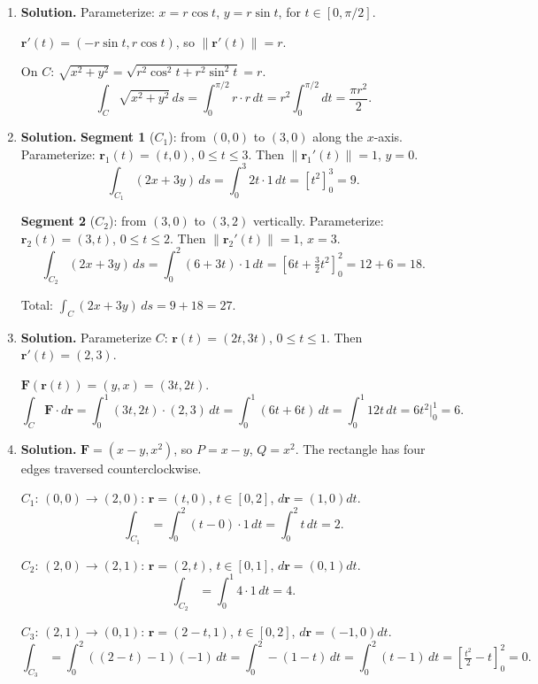 \begin{enumerate}
\item \textbf{Solution.}
Parameterize: $x = r\cos t$, $y = r\sin t$, for $t\in[0,\pi/2]$.

$\mathbf{r}'(t) = (-r\sin t, r\cos t)$, so $\|\mathbf{r}'(t)\| = r$.

On $C$: $\sqrt{x^2+y^2} = \sqrt{r^2\cos^2 t + r^2\sin^2 t} = r$.
\[
\int_C \sqrt{x^2+y^2}\,ds = \int_0^{\pi/2} r\cdot r\,dt = r^2\int_0^{\pi/2}dt = \boxed{\frac{\pi r^2}{2}}.
\]

\item \textbf{Solution.}
\textbf{Segment 1} ($C_1$): from $(0,0)$ to $(3,0)$ along the $x$-axis. Parameterize: $\mathbf{r}_1(t) = (t,0)$, $0\le t\le 3$. Then $\|\mathbf{r}_1'(t)\|=1$, $y=0$.
\[
\int_{C_1}(2x+3y)\,ds = \int_0^3 2t\cdot 1\,dt = \left[t^2\right]_0^3 = 9.
\]

\textbf{Segment 2} ($C_2$): from $(3,0)$ to $(3,2)$ vertically. Parameterize: $\mathbf{r}_2(t) = (3,t)$, $0\le t\le 2$. Then $\|\mathbf{r}_2'(t)\|=1$, $x=3$.
\[
\int_{C_2}(2x+3y)\,ds = \int_0^2 (6+3t)\cdot 1\,dt = \left[6t+\tfrac{3}{2}t^2\right]_0^2 = 12+6 = 18.
\]

Total: $\displaystyle\int_C (2x+3y)\,ds = 9 + 18 = \boxed{27}$.

\item \textbf{Solution.}
Parameterize $C$: $\mathbf{r}(t) = (2t, 3t)$, $0\le t\le 1$. Then $\mathbf{r}'(t)=(2,3)$.

$\mathbf{F}(\mathbf{r}(t)) = (y,x) = (3t, 2t)$.
\[
\int_C \mathbf{F}\cdot d\mathbf{r} = \int_0^1 (3t,2t)\cdot(2,3)\,dt = \int_0^1(6t+6t)\,dt = \int_0^1 12t\,dt = 6t^2\Big|_0^1 = \boxed{6}.
\]

\item \textbf{Solution.}
$\mathbf{F}=(x-y, x^2)$, so $P=x-y$, $Q=x^2$. The rectangle has four edges traversed counterclockwise.

\textbf{$C_1$}: $(0,0)\to(2,0)$: $\mathbf{r}=(t,0)$, $t\in[0,2]$, $d\mathbf{r}=(1,0)dt$.
\[
\int_{C_1} = \int_0^2 (t-0)\cdot 1\,dt = \int_0^2 t\,dt = 2.
\]

\textbf{$C_2$}: $(2,0)\to(2,1)$: $\mathbf{r}=(2,t)$, $t\in[0,1]$, $d\mathbf{r}=(0,1)dt$.
\[
\int_{C_2} = \int_0^1 4\cdot 1\,dt = 4.
\]

\textbf{$C_3$}: $(2,1)\to(0,1)$: $\mathbf{r}=(2-t,1)$, $t\in[0,2]$, $d\mathbf{r}=(-1,0)dt$.
\[
\int_{C_3} = \int_0^2 ((2-t)-1)(-1)\,dt = \int_0^2 -(1-t)\,dt = \int_0^2 (t-1)\,dt = \left[\tfrac{t^2}{2}-t\right]_0^2 = 0.
\]


\end{enumerate}
